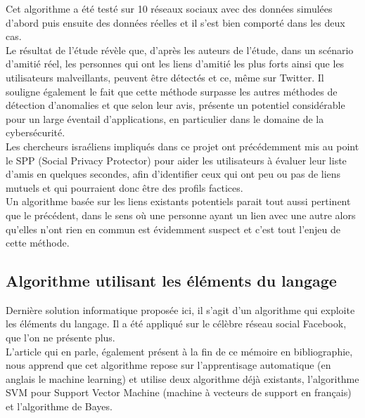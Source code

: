 \documentclass[12pt]{report}
\begin{document}
Cet algorithme a été testé sur 10 réseaux sociaux avec des données simulées d'abord puis ensuite des données réelles et il s'est bien comporté dans les deux cas. \\

Le résultat de l'étude révèle que, d'après les auteurs de l'étude, dans un scénario d’amitié réel, les personnes qui ont les liens d’amitié les plus forts ainsi que les utilisateurs malveillants, peuvent être détectés et ce, même sur Twitter. Il souligne également le fait que cette méthode surpasse les autres méthodes de détection d'anomalies et que selon leur avis, présente un potentiel considérable pour un large éventail d'applications, en particulier dans le domaine de la cybersécurité.\\

Les chercheurs israéliens impliqués dans ce projet ont précédemment mis au point le SPP (Social Privacy Protector) pour aider les utilisateurs à évaluer leur liste d'amis en quelques secondes, afin d'identifier ceux qui ont peu ou pas de liens mutuels et qui pourraient donc être des profils factices.\\

Un algorithme basée sur les liens existants potentiels parait tout aussi pertinent que le précédent, dans le sens où une personne ayant un lien avec une autre alors qu'elles n'ont rien en commun est évidemment suspect et c'est tout l'enjeu de cette méthode.

\subsection{Algorithme utilisant les éléments du langage}
Dernière solution informatique proposée ici, il s'agit d'un algorithme qui exploite les éléments du langage. Il a été appliqué sur le célèbre réseau social Facebook, que l'on ne présente plus. \\

L'article qui en parle, également présent à la fin de ce mémoire en bibliographie, nous apprend que cet algorithme repose sur l'apprentisage automatique (en anglais le machine learning) et utilise deux algorithme déjà existants, l'algorithme SVM pour Support Vector Machine (machine à vecteurs de support en français) et l'algorithme de Bayes.\\
\end{document}

